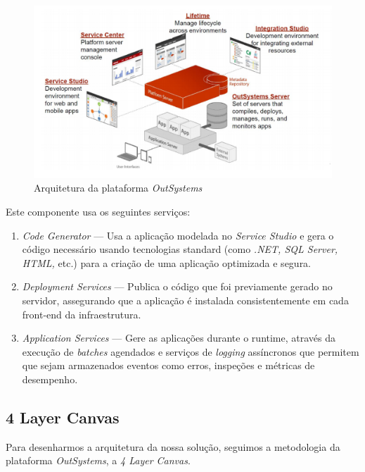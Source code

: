 \begin{figure}[H]
  \centering
  \includegraphics[]{figures/Architecture.png}
  \caption{Arquitetura da plataforma \textit{OutSystems}}\label{fig:outsystemsArch}
\end{figure}

Este componente usa os seguintes serviços: 
\begin{enumerate}
  \item \textit{Code Generator} --- Usa a aplicação modelada no \textit{Service Studio} e gera o código necessário usando tecnologias standard (como \textit{.NET, SQL Server, HTML,} etc.) para a criação de uma aplicação optimizada e segura.
  \item \textit{Deployment Services} --- Publica o código que foi previamente gerado no servidor, assegurando que a aplicação é instalada consistentemente em cada front-end da infraestrutura.
  \item \textit{Application Services} --- Gere as aplicações durante o runtime, através da execução de \textit{batches} agendados e serviços de \textit{logging} assíncronos que permitem que sejam armazenados eventos como erros, inspeções e métricas de desempenho.
\end{enumerate}

\newpage

\subsection{4 Layer Canvas}\label{sec:4lc}

Para desenharmos a arquitetura da nossa solução, seguimos a metodologia da plataforma \textit{OutSystems}, a \textit{4 Layer Canvas}.

